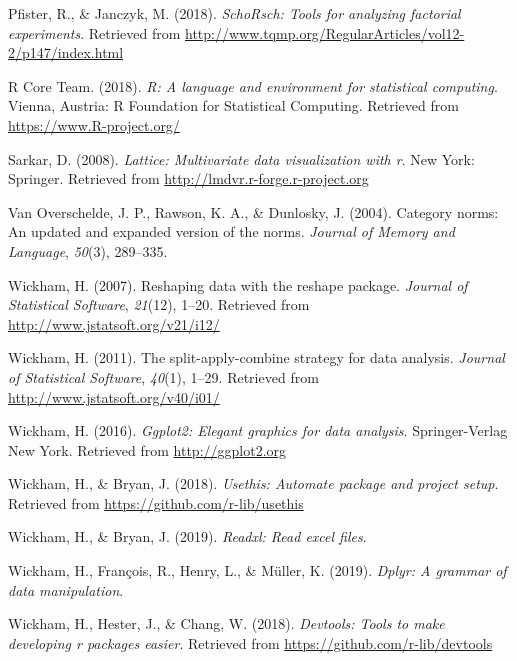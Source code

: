 \documentclass[man]{apa6}
\begin{document}
\leavevmode\hypertarget{ref-R-schoRsch}{}%
Pfister, R., \& Janczyk, M. (2018). \emph{SchoRsch: Tools for analyzing factorial experiments}. Retrieved from \url{http://www.tqmp.org/RegularArticles/vol12-2/p147/index.html}

\leavevmode\hypertarget{ref-R-base}{}%
R Core Team. (2018). \emph{R: A language and environment for statistical computing}. Vienna, Austria: R Foundation for Statistical Computing. Retrieved from \url{https://www.R-project.org/}

\leavevmode\hypertarget{ref-R-lattice}{}%
Sarkar, D. (2008). \emph{Lattice: Multivariate data visualization with r}. New York: Springer. Retrieved from \url{http://lmdvr.r-forge.r-project.org}

\leavevmode\hypertarget{ref-van2004category}{}%
Van Overschelde, J. P., Rawson, K. A., \& Dunlosky, J. (2004). Category norms: An updated and expanded version of the norms. \emph{Journal of Memory and Language}, \emph{50}(3), 289--335.

\leavevmode\hypertarget{ref-R-reshape2}{}%
Wickham, H. (2007). Reshaping data with the reshape package. \emph{Journal of Statistical Software}, \emph{21}(12), 1--20. Retrieved from \url{http://www.jstatsoft.org/v21/i12/}

\leavevmode\hypertarget{ref-R-plyr}{}%
Wickham, H. (2011). The split-apply-combine strategy for data analysis. \emph{Journal of Statistical Software}, \emph{40}(1), 1--29. Retrieved from \url{http://www.jstatsoft.org/v40/i01/}

\leavevmode\hypertarget{ref-R-ggplot2}{}%
Wickham, H. (2016). \emph{Ggplot2: Elegant graphics for data analysis}. Springer-Verlag New York. Retrieved from \url{http://ggplot2.org}

\leavevmode\hypertarget{ref-R-usethis}{}%
Wickham, H., \& Bryan, J. (2018). \emph{Usethis: Automate package and project setup}. Retrieved from \url{https://github.com/r-lib/usethis}

\leavevmode\hypertarget{ref-R-readxl}{}%
Wickham, H., \& Bryan, J. (2019). \emph{Readxl: Read excel files}.

\leavevmode\hypertarget{ref-R-dplyr}{}%
Wickham, H., François, R., Henry, L., \& Müller, K. (2019). \emph{Dplyr: A grammar of data manipulation}.

\leavevmode\hypertarget{ref-R-devtools}{}%
Wickham, H., Hester, J., \& Chang, W. (2018). \emph{Devtools: Tools to make developing r packages easier}. Retrieved from \url{https://github.com/r-lib/devtools}

\endgroup
\end{document}
